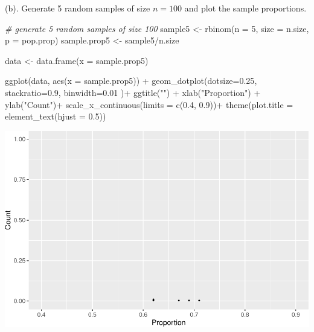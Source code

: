 \documentclass[
]{book}
\newenvironment{Shaded}{\begin{snugshade}}{\end{snugshade}}
\newcommand{\AttributeTok}[1]{\textcolor[rgb]{0.77,0.63,0.00}{#1}}
\newcommand{\CommentTok}[1]{\textcolor[rgb]{0.56,0.35,0.01}{\textit{#1}}}
\newcommand{\DecValTok}[1]{\textcolor[rgb]{0.00,0.00,0.81}{#1}}
\newcommand{\FloatTok}[1]{\textcolor[rgb]{0.00,0.00,0.81}{#1}}
\newcommand{\FunctionTok}[1]{\textcolor[rgb]{0.00,0.00,0.00}{#1}}
\newcommand{\NormalTok}[1]{#1}
\newcommand{\OtherTok}[1]{\textcolor[rgb]{0.56,0.35,0.01}{#1}}
\newcommand{\SpecialCharTok}[1]{\textcolor[rgb]{0.00,0.00,0.00}{#1}}
\newcommand{\StringTok}[1]{\textcolor[rgb]{0.31,0.60,0.02}{#1}}
\begin{document}
(b). Generate 5 random samples of size \(n= 100\) and plot the sample proportions.

\begin{Shaded}
\begin{Highlighting}[]
\CommentTok{\# generate 5 random samples of size 100}
\NormalTok{sample5 }\OtherTok{\textless{}{-}} \FunctionTok{rbinom}\NormalTok{(}\AttributeTok{n =} \DecValTok{5}\NormalTok{, }\AttributeTok{size =}\NormalTok{ n.size, }\AttributeTok{p =}\NormalTok{ pop.prop)  }
\NormalTok{sample.prop5 }\OtherTok{\textless{}{-}}\NormalTok{ sample5}\SpecialCharTok{/}\NormalTok{n.size }

\NormalTok{data }\OtherTok{\textless{}{-}} \FunctionTok{data.frame}\NormalTok{(}\AttributeTok{x =}\NormalTok{ sample.prop5)}

\FunctionTok{ggplot}\NormalTok{(data, }\FunctionTok{aes}\NormalTok{(}\AttributeTok{x =}\NormalTok{ sample.prop5)) }\SpecialCharTok{+}
  \FunctionTok{geom\_dotplot}\NormalTok{(}\AttributeTok{dotsize=}\FloatTok{0.25}\NormalTok{, }\AttributeTok{stackratio=}\FloatTok{0.9}\NormalTok{, }\AttributeTok{binwidth=}\FloatTok{0.01}\NormalTok{ )}\SpecialCharTok{+}
  \FunctionTok{ggtitle}\NormalTok{(}\StringTok{""}\NormalTok{) }\SpecialCharTok{+}  \FunctionTok{xlab}\NormalTok{(}\StringTok{"Proportion"}\NormalTok{) }\SpecialCharTok{+} \FunctionTok{ylab}\NormalTok{(}\StringTok{"Count"}\NormalTok{)}\SpecialCharTok{+}
  \FunctionTok{scale\_x\_continuous}\NormalTok{(}\AttributeTok{limits =} \FunctionTok{c}\NormalTok{(}\FloatTok{0.4}\NormalTok{, }\FloatTok{0.9}\NormalTok{))}\SpecialCharTok{+} 
  \FunctionTok{theme}\NormalTok{(}\AttributeTok{plot.title =} \FunctionTok{element\_text}\NormalTok{(}\AttributeTok{hjust =} \FloatTok{0.5}\NormalTok{))}
\end{Highlighting}
\end{Shaded}

\includegraphics[width=1\linewidth]{Class_Activity_7_files/figure-latex/unnamed-chunk-6-1}
\end{document}
